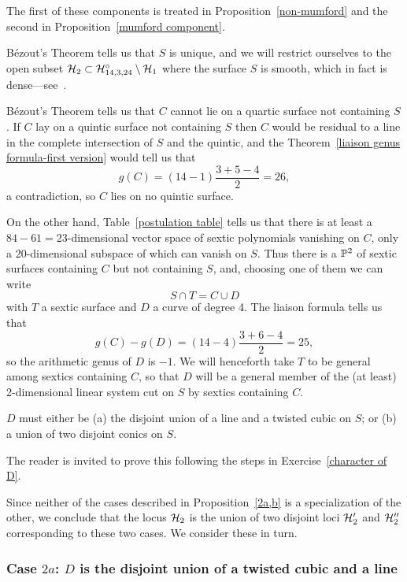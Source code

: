 The first of these components is treated in Proposition~\ref{non-mumford} and the second in Proposition~\ref{mumford component}.

B\'ezout's Theorem tells us that  $S$  is unique, and we will restrict ourselves to the open subset $\cH_2 \subset \cH^\circ_{14,3,24} \setminus \cH_1$ where the surface $S$ is smooth, which in fact is dense---see~\cite{Nasu2008}.

B\'ezout's Theorem tells us that $C$ cannot lie on a quartic surface not containing $S$. If $C$ lay on a quintic surface not containing $S$ then $C$ would be residual to a line in the complete intersection of $S$ and the quintic, and the Theorem~\ref{liaison genus formula-first version} would tell us that 
$$
g(C) = (14-1)\frac{3+5-4}{2} = 26,
$$
a contradiction, so $C$ lies on no quintic surface.

On the other hand, Table~\ref{postulation table} tells us that there is at least a $84-61 = 23$-dimensional vector space of sextic polynomials vanishing on  $C$, only a 20-dimensional subspace of which can vanish on $S$. Thus there is a $\PP^2$ of sextic surfaces containing $C$ but not containing $S$, and, choosing one of them we can write
$$
S \cap T = C \cup D
$$
with $T$ a sextic surface and $D$ a curve of degree 4. The liaison formula  tells us that
$$
g(C) - g(D) = (14 - 4)\frac{3+6-4}{2} = 25,
$$
so the arithmetic genus of $D$ is $-1$. We will henceforth take $T$ to be general among sextics containing $C$, so that $D$ will be a general member of the (at least) 2-dimensional linear system cut on $S$ by sextics containing $C$.

\begin{proposition}\label {2a,b}
$D$ must either be (a) the disjoint union of a line and a twisted cubic on $S$; or (b) a union of two disjoint conics on $S$. 
\end{proposition}

The reader is invited to prove this following the steps in Exercise~\ref{character of D}.

Since neither of the cases described in Proposition~\ref{2a,b} is a specialization of the other, we conclude that the locus $\cH_2$ is the union of two disjoint loci $\cH_{2}'$ and $\cH_{2}''$ corresponding to these two cases. We consider these in turn.


\subsubsection{Case $2a$: $D$ is the disjoint union of a twisted cubic and a line}


